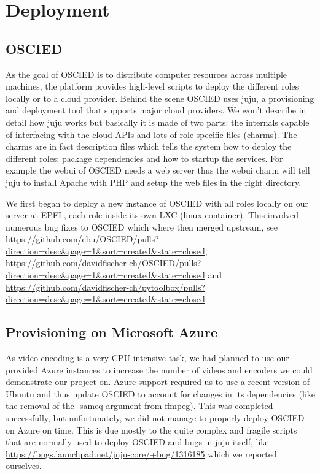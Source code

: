\documentclass[a4paper,12pt]{article}
\begin{document}

\section{Deployment}
\subsection{OSCIED}
As the goal of OSCIED is to distribute computer resources across multiple
machines, the platform provides high-level scripts to deploy the different roles
locally or to a cloud provider.  Behind the scene OSCIED uses juju, a
provisioning and deployment tool that supports major cloud providers.  We won't
describe in detail how juju works but basically it is made of two parts: the
internals capable of interfacing with the cloud APIs and lots of
role-specific files (charms).  The charms are in fact description files which
tells the system how to deploy the different roles: package dependencies and how
to startup the services.  For example the webui of OSCIED needs a web server
thus the webui charm will tell juju to install Apache with PHP and setup the web
files in the right directory.

We first began to deploy a new instance of OSCIED with all roles locally on our
server at EPFL, each role inside its own LXC (linux container).  This involved
numerous bug fixes to OSCIED which where then merged upstream, see
\url{https://github.com/ebu/OSCIED/pulls?direction=desc&page=1&sort=created&state=closed},
\url{https://github.com/davidfischer-ch/OSCIED/pulls?direction=desc&page=1&sort=created&state=closed}
and
\url{https://github.com/davidfischer-ch/pytoolbox/pulls?direction=desc&page=1&sort=created&state=closed}.

\subsection{Provisioning on Microsoft Azure}
As video encoding is a very CPU intensive task, we had planned to use our
provided Azure instances to increase the number of videos and encoders we could
demonstrate our project on. Azure support required us to use a recent version of
Ubuntu and thus update OSCIED to account for changes in its dependencies (like
the removal of the -sameq argument from ffmpeg). This was completed
successfully, but unfortunately, we did not manage to properly deploy OSCIED on
Azure on time. This is due mostly to the quite complex and fragile scripts that
are normally used to deploy OSCIED and bugs in juju itself, like
\url{https://bugs.launchpad.net/juju-core/+bug/1316185} which we reported ourselves.
\end{document}
